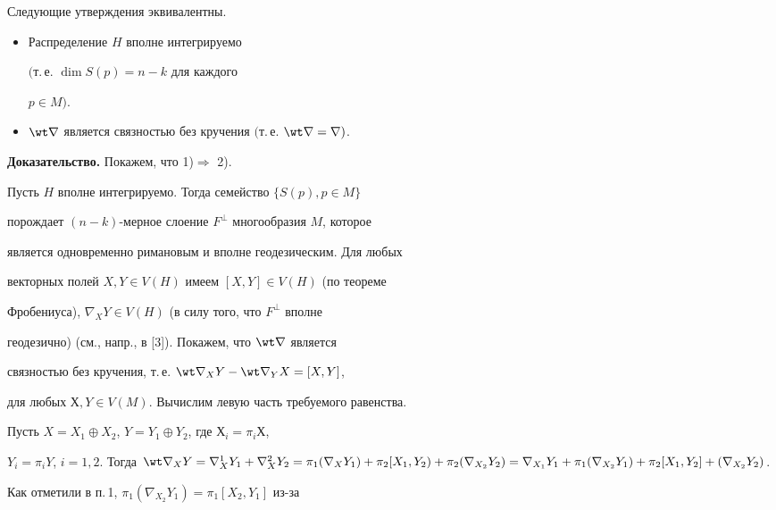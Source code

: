 \begin{thm}


Следующие утверждения эквивалентны.


\begin{itemize}


\item[1.] Распределение $H$ вполне интегрируемо


$($т.\,е. $\dim S(p)=n-k$ для каждого 


$p \in M)$.


\item[2.] $\wt \nabla$ является связностью без кручения $($т.\,е. $\wt 


\nabla=\nabla)$.


\end{itemize}


\end{thm}





{\bf Доказательство.} Покажем, что 1)$\Rightarrow$ 2). 





Пусть $H$ вполне интегрируемо. Тогда семейство $\{S(p), p \in M\}$ 


порождает $(n{-}k)$-мерное слоение $F^\bot$ многообразия $M$, которое 


является одновременно римановым и вполне геодезическим. Для любых 


векторных полей $X,Y\in V(H)$ имеем $[X,Y] \in V(H)$ (по теореме 


Фробениуса), $\nabla_XY \in V(H)$ (в силу того, что $F^\bot$ вполне 


геодезично) (см., напр., в [3]). Покажем, что $\wt \nabla$ является 


связностью без кручения, т.\,е. $\wt \nabla_XY-\wt \nabla_YX=[X,Y]$, 


для любых $Х, Y \in V(M)$. Вычислим левую часть требуемого равенства. 


Пусть $X=X_1\oplus X_2$, $Y=Y_1\oplus Y_2$, где $Х_i=\pi_iХ$, 


$Y_i=\pi_iY$, $i=1,2$. Тогда $\wt 


\nabla_XY=\nabla^1_XY_1+\nabla_X^2Y_2=\pi_1(\nabla_{X}Y_1)+\pi_2 


[X_1, Y_2)+ \pi_2 (\nabla_{X_2}Y_2) =\nabla_{X_1}Y_1+ 


\pi_1(\nabla_{X_2}Y_1) + \pi_2 [X_1, Y_2] + (\nabla_{X_2}Y_2)$.


Как отметили в п.\,1, $\pi_1(\nabla_{X_2}Y_1)=\pi_1[X_2, Y_1]$ из-за


